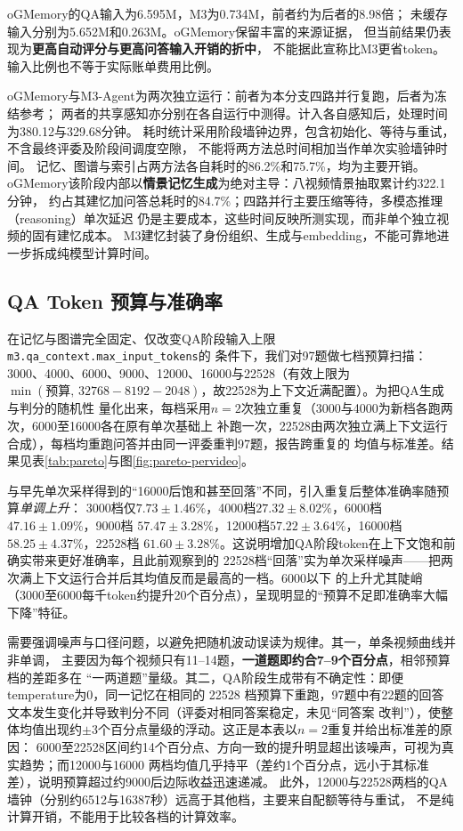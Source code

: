 \documentclass[UTF8,a4paper,11pt,fontset=fandol]{ctexart}
\DeclareRobustCommand{\code}[1]{\nolinkurl{#1}}
\newcommand*{\memoryprojectname}{oGMemory}
\begin{document}
\memoryprojectname{}的QA输入为6.595M，M3为0.734M，前者约为后者的8.98倍；
未缓存输入分别为5.652M和0.263M。\memoryprojectname{}保留丰富的来源证据，
但当前结果仍表现为\textbf{更高自动评分与更高问答输入开销的折中}，
不能据此宣称比M3更省token。输入比例也不等于实际账单费用比例。

\memoryprojectname{}与M3-Agent为两次独立运行：前者为本分支四路并行复跑，后者为冻结参考；
两者的共享感知亦分别在各自运行中测得。计入各自感知后，处理时间为380.12与329.68分钟。
耗时统计采用阶段墙钟边界，包含初始化、等待与重试，不含最终评委及阶段间调度空隙，
不能将两方法总时间相加当作单次实验墙钟时间。
记忆、图谱与索引占两方法各自耗时的86.2\%和75.7\%，均为主要开销。
\memoryprojectname{}该阶段内部以\textbf{情景记忆生成}为绝对主导：八视频情景抽取累计约322.1分钟，
约占其建忆加问答总耗时的84.7\%；四路并行主要压缩等待，多模态推理（reasoning）单次延迟
仍是主要成本，这些时间反映所测实现，而非单个独立视频的固有建忆成本。
M3建忆封装了身份组织、生成与embedding，不能可靠地进一步拆成纯模型计算时间。

\subsection{QA Token 预算与准确率}
在记忆与图谱完全固定、仅改变QA阶段输入上限\code{m3.qa\_context.max\_input\_tokens}的
条件下，我们对97题做七档预算扫描：3000、4000、6000、9000、12000、16000与22528（有效上限为
$\min(\text{预算},\,32768-8192-2048)$，故22528为上下文近满配置）。为把QA生成与判分的随机性
量化出来，每档采用$n=2$次独立重复（3000与4000为新档各跑两次，6000至16000各在原有单次基础上
补跑一次，22528由两次独立满上下文运行合成），每档均重跑问答并由同一评委重判97题，报告跨重复的
均值与标准差。结果见表\ref{tab:pareto}与图\ref{fig:pareto-pervideo}。

与早先单次采样得到的“16000后饱和甚至回落”不同，引入重复后整体准确率随预算\emph{单调上升}：
3000档仅$7.73\pm1.46\%$，4000档$27.32\pm8.02\%$，6000档$47.16\pm1.09\%$，9000档
$57.47\pm3.28\%$，12000档$57.22\pm3.64\%$，16000档$58.25\pm4.37\%$，22528档
$61.60\pm3.28\%$。这说明增加QA阶段token在上下文饱和前确实带来更好准确率，且此前观察到的
22528档“回落”实为单次采样噪声——把两次满上下文运行合并后其均值反而是最高的一档。6000以下
的上升尤其陡峭（3000至6000每千token约提升20个百分点），呈现明显的“预算不足即准确率大幅下降”特征。

需要强调噪声与口径问题，以避免把随机波动误读为规律。其一，单条视频曲线并非单调，
主要因为每个视频只有11--14题，\textbf{一道题即约合7--9个百分点}，相邻预算档的差距多在
“一两道题”量级。其二，QA阶段生成带有不确定性：即便temperature为0，同一记忆在相同的 22528 档预算下重跑，97题中有22题的回答文本发生变化并导致判分不同（评委对相同答案稳定，未见“同答案
改判”），使整体均值出现约$\pm$3个百分点量级的浮动。这正是本表以$n=2$重复并给出标准差的原因：
6000至22528区间约14个百分点、方向一致的提升明显超出该噪声，可视为真实趋势；而12000与16000
两档均值几乎持平（差约1个百分点，远小于其标准差），说明预算超过约9000后边际收益迅速递减。
此外，12000与22528两档的QA墙钟（分别约6512与16387秒）远高于其他档，主要来自配额等待与重试，
不是纯计算开销，不能用于比较各档的计算效率。
\end{document}
